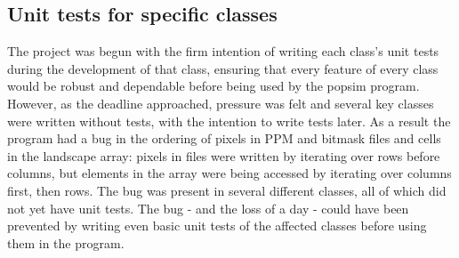 \subsection{Unit tests for specific classes}
The project was begun with the firm intention of writing each class's unit tests during the development of that class, ensuring that every feature of every class would be robust and dependable before being used by the popsim program.  However, as the deadline approached, pressure was felt and several key classes were written without tests, with the intention to write tests later.
As a result the program had a bug in the ordering of pixels in PPM and bitmask files and cells in the landscape array: pixels in files were written by iterating over rows before columns, but elements in the array were being accessed by iterating over columns first, then rows.  The bug was present in several different classes, all of which did not yet have unit tests.
The bug - and the loss of a day - could have been prevented by writing even basic unit tests of the affected classes before using them in the program.


